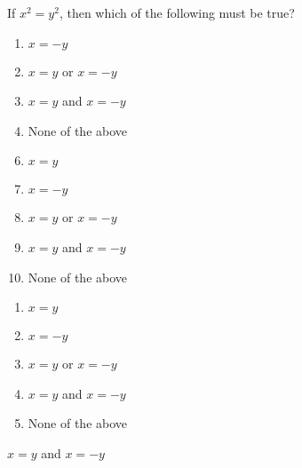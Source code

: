 

 If $x^{2}=y^{2}$, then which of the following must be true?


\ifsat
	\begin{enumerate}[label=\Alph*)]
		\item  $x=-y$
		\item  $x=y$ or $x=-y$
		\item  $x=y$ and $x=-y$%
		\item  None of the above
	\end{enumerate}
\else
\fi

\ifacteven
	\begin{enumerate}[label=\textbf{\Alph*.},itemsep=\fill,align=left]
		\setcounter{enumii}{5}
		\item   $x=y$
		\item  $x=-y$
		\item  $x=y$ or $x=-y$
		\addtocounter{enumii}{1}
		\item  $x=y$ and $x=-y$%
		\item  None of the above
	\end{enumerate}
\else
\fi

\ifactodd
	\begin{enumerate}[label=\textbf{\Alph*.},itemsep=\fill,align=left]
		\item   $x=y$
		\item  $x=-y$
		\item  $x=y$ or $x=-y$
		\item  $x=y$ and $x=-y$%
		\item  None of the above
	\end{enumerate}
\else
\fi

\ifgridin
  $x=y$ and $x=-y$%
		
\else
\fi

